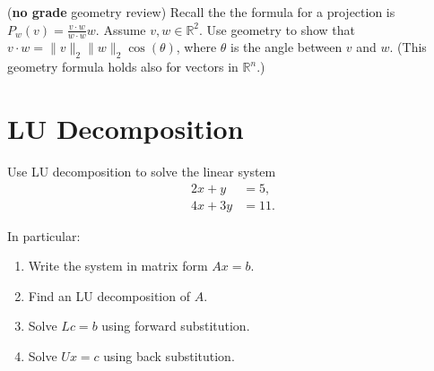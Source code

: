 \documentclass{ximera}
\begin{document}
\begin{exercise} (\textbf{no grade} geometry review)
    Recall the the formula for a projection is $P_w(v) = \frac{v\cdot w}{w \cdot w} w$.  Assume $v,w \in \mathbb{R}^2$.  Use geometry to show that $v\cdot w = \|v\|_2\|w\|_2 \cos(\theta)$, where $\theta$ is the angle between $v$ and $w$.  (This geometry formula holds also for vectors in $\mathbb{R}^n$.)
\end{exercise}

\section{LU Decomposition}




\begin{exercise}
Use LU decomposition to solve the linear system
\[
\begin{aligned}
2x+y &= 5,\\
4x+3y &= 11.
\end{aligned}
\]

In particular:

\begin{enumerate}
    \item Write the system in matrix form $Ax=b$.
    \item Find an LU decomposition of $A$.
    \item Solve $Lc=b$ using forward substitution.
    \item Solve $Ux=c$ using back substitution.
\end{enumerate}

\end{exercise}
\end{document}
